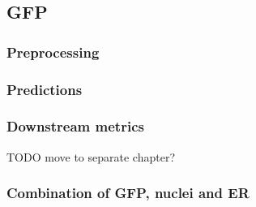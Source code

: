\subsection{GFP}
    \subsubsection{Preprocessing}
        
    \subsubsection{Predictions}
        
    \subsubsection{Downstream metrics}
        TODO move to separate chapter?
        
    \subsubsection{Combination of GFP, nuclei and ER}
        
